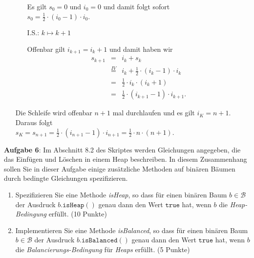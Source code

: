 \documentclass{article}
\begin{document}
\begin{enumerate}
\begin{enumerate}
            Es gilt $s_0 = 0$ und $i_0 = 0$ und damit folgt sofort
            \\[0.2cm]
            \hspace*{1.3cm} $s_0 = \frac{1}{2} \cdot (i_{0}-1) \cdot i_0$.
      \item[I.S.:] $k \mapsto k+1$ 

            Offenbar gilt $i_{k+1} = i_k + 1$ und damit haben wir 
            \begin{eqnarray*}
              s_{k+1} & = & i_k + s_k \\
            & \stackrel{IV}{=} & i_k + \frac{1}{2} \cdot (i_{k}-1) \cdot i_k \\
            & = & \frac{1}{2} \cdot i_{k} \cdot (i_k + 1) \\
            & = & \frac{1}{2} \cdot (i_{k+1} - 1) \cdot i_{k+1}.
            \end{eqnarray*}
      \end{enumerate}
      Die Schleife wird offenbar $n+1$ mal durchlaufen und es gilt $i_K = n+1$.  Daraus folgt
      \\[0.2cm]
      \hspace*{1.3cm}
      $s_K = s_{n+1} = \frac{1}{2} \cdot (i_{n+1} - 1) \cdot i_{n+1} = \frac{1}{2} \cdot n \cdot (n+1)$.
\end{enumerate}
\vspace{0.3cm}
\pagebreak


\noindent
\textbf{Aufgabe 6}:  Im Abschnitt 8.2 des Skriptes
werden Gleichungen angegeben, die das Einf\"ugen und L\"oschen in einem Heap beschreiben.
In diesem Zusammenhang sollen Sie in dieser Aufgabe  einige zus\"atzliche Methoden auf
bin\"aren B\"aumen durch bedingte Gleichungen spezifizieren.
\begin{enumerate}
\item Spezifizieren Sie eine Methode \textsl{isHeap}, so
      dass f\"ur einen bin\"aren Baum $b \in \mathcal{B}$ der Ausdruck 
      $b.\mathtt{isHeap}()$ genau dann den Wert $\mathtt{true}$ hat, wenn $b$ die
      \emph{Heap-Bedingung} erf\"ullt.  \hspace*{\fill} (10 Punkte)
\item Implementieren Sie eine Methode \textsl{isBalanced}, so
      dass f\"ur einen bin\"aren Baum $b \in \mathcal{B}$ der Ausdruck 
      $b.\mathtt{isBalanced}()$ genau dann den Wert $\mathtt{true}$ hat, wenn $b$ die
      \emph{Balancierungs-Bedingung} f\"ur \emph{Heaps} erf\"ullt.  
      \hspace*{\fill} (5 Punkte)
\end{enumerate}
\vspace{0.3cm}
\end{document}
